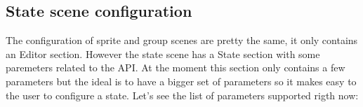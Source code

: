 \documentclass[letterpaper,10pt,english]{sphinxmanual}
\begin{document}
\subsection{State scene configuration}
\label{\detokenize{canvas:state-scene-configuration}}
The configuration of sprite and group scenes are pretty the same, it only contains an Editor section. However the state scene has a State section with some paremeters related to the  API. At the moment this section only contains a few parameters but the ideal is to have a bigger set of parameters so it makes easy to the user to configure a state. Let’s see the list of parameters supported rigth now:


\begin{savenotes}\sphinxattablestart
\centering
\begin{tabulary}{\linewidth}[t]{|T|T|}
\hline


\end{tabulary}
\end{savenotes}
\end{document}
